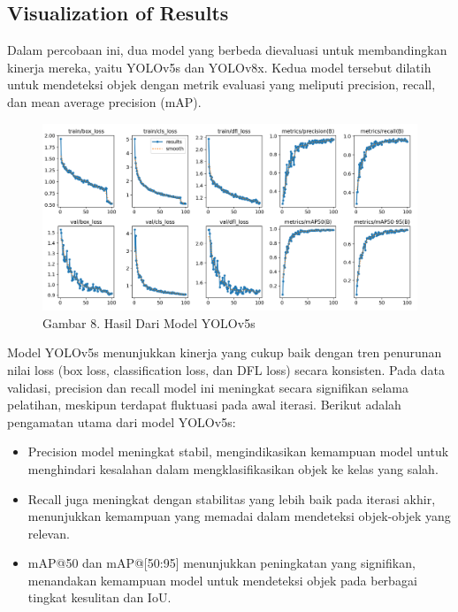 \documentclass[12pt,a4paper]{article}
\begin{document}
\subsection{Visualization of Results}
\begin{adjustwidth}{3em}{0pt}
\hspace{0.5cm} Dalam percobaan ini, dua model yang berbeda dievaluasi untuk membandingkan kinerja mereka, yaitu YOLOv5s dan YOLOv8x. Kedua model tersebut dilatih untuk mendeteksi objek dengan metrik evaluasi yang meliputi precision, recall, dan mean average precision (mAP).
\begin{figure}[h]
    \centering
    \includegraphics[width=0.6\linewidth]{Images/Gambar8Hasil.png}
    \caption*{Gambar 8. Hasil Dari Model YOLOv5s}
    \label{fig:enter-label}
\end{figure}


Model YOLOv5s menunjukkan kinerja yang cukup baik dengan tren penurunan nilai loss (box loss, classification loss, dan DFL loss) secara konsisten. Pada data validasi, precision dan recall model ini meningkat secara signifikan selama pelatihan, meskipun terdapat fluktuasi pada awal iterasi. Berikut adalah pengamatan utama dari model YOLOv5s:
\begin{itemize}
    \item Precision model meningkat stabil, mengindikasikan kemampuan model untuk menghindari kesalahan dalam mengklasifikasikan objek ke kelas yang salah.
    \item Recall juga meningkat dengan stabilitas yang lebih baik pada iterasi akhir, menunjukkan kemampuan yang memadai dalam mendeteksi objek-objek yang relevan.
    \item mAP@50 dan mAP@[50:95] menunjukkan peningkatan yang signifikan, menandakan kemampuan model untuk mendeteksi objek pada berbagai tingkat kesulitan dan IoU.


\end{itemize}
\end{adjustwidth}
\end{document}
